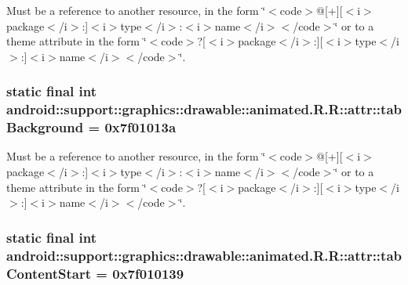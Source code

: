 Must be a reference to another resource, in the form \char`\"{}$<$code$>$@\mbox{[}+\mbox{]}\mbox{[}$<$i$>$package$<$/i$>$:\mbox{]}$<$i$>$type$<$/i$>$:$<$i$>$name$<$/i$>$$<$/code$>$\char`\"{} or to a theme attribute in the form \char`\"{}$<$code$>$?\mbox{[}$<$i$>$package$<$/i$>$:\mbox{]}\mbox{[}$<$i$>$type$<$/i$>$:\mbox{]}$<$i$>$name$<$/i$>$$<$/code$>$\char`\"{}. \hypertarget{classandroid_1_1support_1_1graphics_1_1drawable_1_1animated_1_1_r_1_1attr_b031cf1b338ec197cad986be890fa14c}{
\subsubsection[{tabBackground}]{\setlength{\rightskip}{0pt plus 5cm}static final int android::support::graphics::drawable::animated.R.R::attr::tabBackground = 0x7f01013a}}
\label{classandroid_1_1support_1_1graphics_1_1drawable_1_1animated_1_1_r_1_1attr_b031cf1b338ec197cad986be890fa14c}


Must be a reference to another resource, in the form \char`\"{}$<$code$>$@\mbox{[}+\mbox{]}\mbox{[}$<$i$>$package$<$/i$>$:\mbox{]}$<$i$>$type$<$/i$>$:$<$i$>$name$<$/i$>$$<$/code$>$\char`\"{} or to a theme attribute in the form \char`\"{}$<$code$>$?\mbox{[}$<$i$>$package$<$/i$>$:\mbox{]}\mbox{[}$<$i$>$type$<$/i$>$:\mbox{]}$<$i$>$name$<$/i$>$$<$/code$>$\char`\"{}. \hypertarget{classandroid_1_1support_1_1graphics_1_1drawable_1_1animated_1_1_r_1_1attr_c7b124ad0b70da95de1156997cd09d5b}{
\subsubsection[{tabContentStart}]{\setlength{\rightskip}{0pt plus 5cm}static final int android::support::graphics::drawable::animated.R.R::attr::tabContentStart = 0x7f010139}}
\label{classandroid_1_1support_1_1graphics_1_1drawable_1_1animated_1_1_r_1_1attr_c7b124ad0b70da95de1156997cd09d5b}


